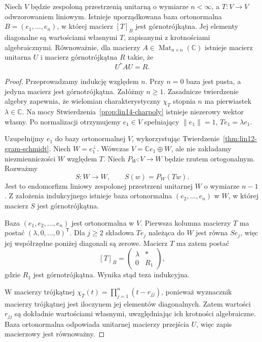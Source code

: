 \begin{twierdzenie}
\label{thm:lin14-schur}
Niech \(V\) będzie zespoloną przestrzenią
unitarną o wymiarze \(n<\infty\), a
\(T\colon V\to V\) odwzorowaniem liniowym.
Istnieje uporządkowana baza ortonormalna
\(B=(e_1,\ldots,e_n)\), w której macierz
\([T]_B\) jest górnotrójkątna.
Jej elementy diagonalne są wartościami
własnymi \(T\), zapisanymi z krotnościami
algebraicznymi.
Równoważnie, dla macierzy
\(A\in\operatorname{Mat}_{n\times n}(\mathbb C)\)
istnieje macierz unitarna \(U\)
i macierz górnotrójkątna \(R\) takie, że
\[
 U^*AU=R.
\]
\end{twierdzenie}
\begin{proof}
Przeprowadzamy indukcję względem \(n\).
Przy \(n=0\) baza jest pusta,
a jedyna macierz jest górnotrójkątna.
Załóżmy \(n\ge1\).
Zasadnicze twierdzenie algebry zapewnia,
że wielomian charakterystyczny \(\chi_T\)
stopnia \(n\) ma pierwiastek
\(\lambda\in\mathbb C\).
Na mocy
Stwierdzenia~\ref{prop:lin14-charpoly}
istnieje niezerowy wektor własny.
Po normalizacji otrzymujemy
\(e_1\in V\) spełniający
\(\|e_1\|=1\), \(Te_1=\lambda e_1\).

Uzupełnijmy \(e_1\) do bazy ortonormalnej
\(V\), wykorzystując
Twierdzenie~\ref{thm:lin12-gram-schmidt}.
Niech \(W=e_1^\perp\).
Wówczas \(V=\mathbb C e_1\oplus W\),
ale nie zakładamy niezmienniczości \(W\)
względem \(T\).
Niech \(P_W\colon V\to W\) będzie
rzutem ortogonalnym. Rozważmy
\[
 S\colon W\to W,\qquad S(w)=P_W(Tw).
\]
Jest to endomorfizm liniowy
zespolonej przestrzeni unitarnej \(W\)
o wymiarze \(n-1\).
Z założenia indukcyjnego istnieje
baza ortonormalna
\((e_2,\ldots,e_n)\) w \(W\),
w której macierz \(S\) jest
górnotrójkątna.

Baza \((e_1,e_2,\ldots,e_n)\) jest
ortonormalna w \(V\).
Pierwsza kolumna macierzy \(T\)
ma postać \((\lambda,0,\ldots,0)^{\mathsf T}\).
Dla \(j\ge2\) składowa
\(T e_j\) należąca do \(W\)
jest równa \(S e_j\),
więc jej współrzędne poniżej
diagonali są zerowe.
Macierz \(T\) ma zatem postać
\[
 [T]_B=
 \begin{pmatrix}
 \lambda& *\\
 0&R_1
 \end{pmatrix},
\]
gdzie \(R_1\) jest górnotrójkątna.
Wynika stąd teza indukcyjna.

W macierzy trójkątnej
\(\chi_T(t)=\prod_{j=1}^n(t-r_{jj})\),
ponieważ wyznacznik macierzy
trójkątnej jest iloczynem
jej elementów diagonalnych.
Zatem wartości \(r_{jj}\)
są dokładnie wartościami
własnymi, uwzględniając ich
krotności algebraiczne.
Baza ortonormalna odpowiada
unitarnej macierzy przejścia \(U\),
więc zapis macierzowy jest równoważny.
\end{proof}

